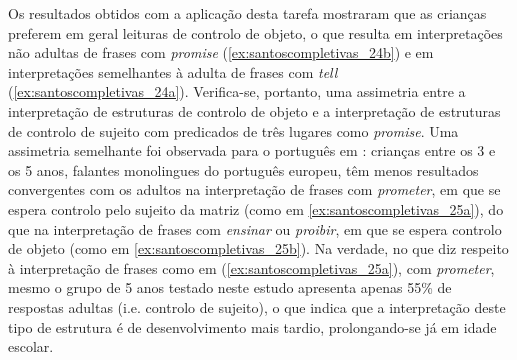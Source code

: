 \documentclass[output=paper]{LSP/langsci}
\begin{document}
\ea\label{ex:santoscompletivas_24}
\zl

Os resultados obtidos com a aplicação desta tarefa mostraram que as crianças preferem em geral leituras de controlo de objeto, o que resulta em interpretações não adultas de frases com \textit{promise} (\ref{ex:santoscompletivas_24b}) e em interpretações semelhantes à adulta de frases com \textit{tell} (\ref{ex:santoscompletivas_24a}). Verifica-se, portanto, uma assimetria entre a interpretação de estruturas de controlo de objeto e a interpretação de estruturas de controlo de sujeito com predicados de três lugares como \textit{promise}. Uma assimetria semelhante foi observada para o português em \citet{agostinho2014}: crianças entre os 3 e os 5 anos, falantes monolingues do português europeu, têm menos resultados convergentes com os adultos na interpretação de frases com \textit{prometer}, em que se espera controlo pelo sujeito da matriz (como em \ref{ex:santoscompletivas_25a}), do que na interpretação de frases com \textit{ensinar} ou \textit{proibir}, em que se espera controlo de objeto (como em \ref{ex:santoscompletivas_25b}). Na verdade, no que diz respeito à interpretação de frases como em (\ref{ex:santoscompletivas_25a}), com \textit{prometer}, mesmo o grupo de 5 anos testado neste estudo apresenta apenas 55\% de respostas adultas (i.e. controlo de sujeito), o que indica que a interpretação deste tipo de estrutura é de desenvolvimento mais tardio, prolongando-se já em idade escolar. 
\end{document}
